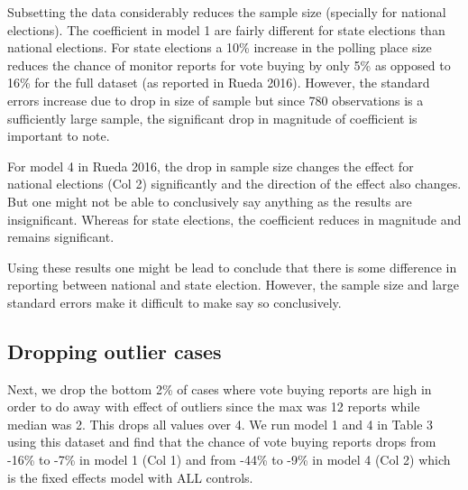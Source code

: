 \documentclass[12pt]{article}
\begin{document}
Subsetting the data considerably reduces the sample size (specially for national elections). The coefficient in model 1 are fairly different for state elections than national elections. For state elections a 10\% increase in the polling place size reduces the chance of monitor reports for vote buying by only 5\% as opposed to 16\% for the full dataset (as reported in Rueda 2016). However, the standard errors increase due to drop in size of sample but since 780 observations is a sufficiently large sample, the significant drop in magnitude of coefficient is important to note. 

For model 4 in Rueda 2016, the drop in sample size changes the effect for national elections (Col 2) significantly and the direction of the effect also changes. But one might not be able to conclusively say anything as the results are insignificant. Whereas for state elections, the coefficient reduces in magnitude and remains significant. 

Using these results one might be lead to conclude that there is some difference in reporting between national and state election. However, the sample size and large standard errors make it difficult to make say so conclusively. 

\subsection{Dropping outlier cases}
Next, we drop the bottom 2\% of cases where vote buying reports are high in order to do away with effect of outliers since the max was 12 reports while median was 2. This drops all values over 4. We run model 1 and 4 in Table 3 using this dataset and find that the chance of vote buying reports drops from -16\% to -7\% in model 1 (Col 1) and from -44\% to -9\% in model 4 (Col 2) which is the fixed effects model with ALL controls. 
\FloatBarrier

\begin{table}[]
    \caption*{Extension of Table 3 Subsetted to Only Municipalities with Fewer than 4 Reports of Vote Buying}
 \singlespacing   
    \centering
{}
\end{table}
\FloatBarrier
\end{document}
